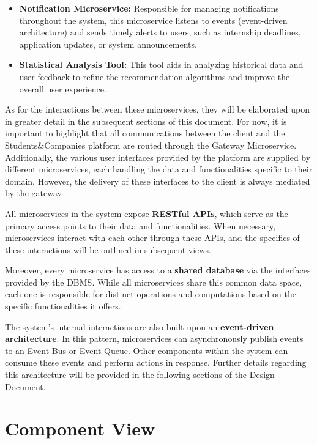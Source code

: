 \begin{itemize}
    \item \textbf{Notification Microservice:} Responsible for managing notifications throughout the system, this microservice listens to events (event-driven architecture) and sends timely alerts to users, such as internship deadlines, application updates, or system announcements.

    \item \textbf{Statistical Analysis Tool:} This tool aids in analyzing historical data and user feedback to refine the recommendation algorithms and improve the overall user experience.
\end{itemize}

As for the interactions between these microservices, they will be elaborated upon in greater detail in the subsequent sections of this document. For now, it is important to highlight that all communications between the client and the Students\&Companies platform are routed through the Gateway Microservice. Additionally, the various user interfaces provided by the platform are supplied by different microservices, each handling the data and functionalities specific to their domain. However, the delivery of these interfaces to the client is always mediated by the gateway.

All microservices in the system expose \textbf{RESTful APIs}, which serve as the primary access points to their data and functionalities. When necessary, microservices interact with each other through these APIs, and the specifics of these interactions will be outlined in subsequent views.

Moreover, every microservice has access to a \textbf{shared database} via the interfaces provided by the DBMS. While all microservices share this common data space, each one is responsible for distinct operations and computations based on the specific functionalities it offers.

The system’s internal interactions are also built upon an \textbf{event-driven architecture}. In this pattern, microservices can asynchronously publish events to an Event Bus or Event Queue. Other components within the system can consume these events and perform actions in response. Further details regarding this architecture will be provided in the following sections of the Design Document.

\section{Component View}

